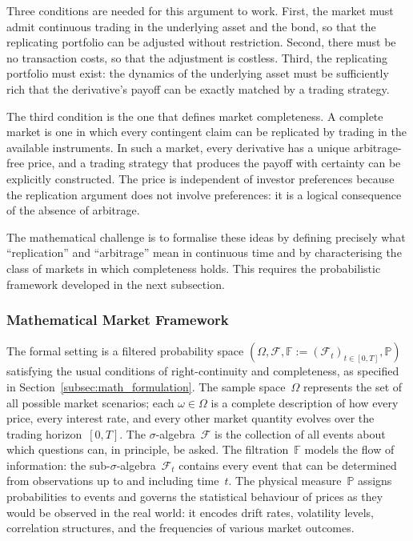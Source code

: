 Three conditions are needed for this argument to work.  First, the market
must admit continuous trading in the underlying asset and the bond, so
that the replicating portfolio can be adjusted without restriction.
Second, there must be no transaction costs, so that the adjustment is
costless.  Third, the replicating portfolio must exist: the dynamics of
the underlying asset must be sufficiently rich that the derivative's
payoff can be exactly matched by a trading strategy.

The third condition is the one that defines market completeness.  A
complete market is one in which every contingent claim can be replicated
by trading in the available instruments.  In such a market, every
derivative has a unique arbitrage-free price, and a trading strategy that
produces the payoff with certainty can be explicitly constructed.  The
price is independent of investor preferences because the replication
argument does not involve preferences: it is a logical consequence of the
absence of arbitrage.

The mathematical challenge is to formalise these ideas by defining precisely what “replication” and “arbitrage” mean in continuous time and by characterising the class of markets in which completeness holds. This requires the probabilistic framework developed in the next subsection.



\subsubsection{Mathematical Market Framework}
\label{sssec:prob_framework}

The formal setting is a filtered probability space
$(\Omega, \mathcal{F},
\mathbb{F} := (\mathcal{F}_t)_{t \in [0,T]}, \mathbb{P})$
satisfying the usual conditions of right-continuity and completeness, as
specified in Section~\ref{subsec:math_formulation}.  The sample
space~$\Omega$ represents the set of all possible market scenarios; each
$\omega \in \Omega$ is a complete description of how every price, every
interest rate, and every other market quantity evolves over the trading
horizon~$[0,T]$.  The $\sigma$-algebra~$\mathcal{F}$ is the collection of
all events about which questions can, in principle, be asked.  The
filtration~$\mathbb{F}$ models the flow of information: the
sub-$\sigma$-algebra~$\mathcal{F}_t$ contains every event that can be
determined from observations up to and including time~$t$.
The physical measure~$\mathbb{P}$ assigns probabilities to events and
governs the statistical behaviour of prices as they would be observed in
the real world: it encodes drift rates, volatility levels, correlation
structures, and the frequencies of various market outcomes.

